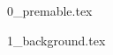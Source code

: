 \documentclass[ %
                    author={Oliver Ryan-George},
                supervisor={Dr. Miranda Mowbray},
                    degree={BSc},
                     title={Natural Language Processing in the Law Domain},
                  subtitle={},
                      year={2019} ]{resources/dissertation}
\begin{document}

\maketitle


\frontmatter


\makedecl


\newpage
{0_premable.tex}




\mainmatter

{1_background.tex}

\cleardoublepage

\begingroup
    \renewcommand\bibname{References \vspace*{-10mm}}
    \scriptsize
    \setlength\bibitemsep{5pt}
    \printbibliography
\endgroup
\end{document}
